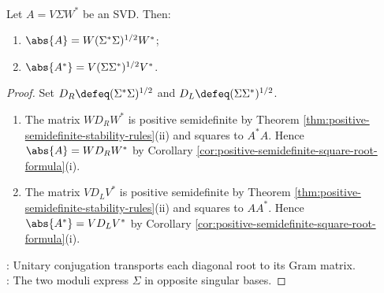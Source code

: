 \begin{proposition} \label{prop:matrix-modulus-from-svd} \\
Let $A=V\Sigma W^*$ be an SVD. Then:
\begin{enumerate}[label=(\roman*)]
\setlength{\itemsep}{0pt}
\item $\abs{A}=W(\Sigma^*\Sigma)^{1/2}W^*$;
\item $\abs{A^*}=V(\Sigma\Sigma^*)^{1/2}V^*$.
\end{enumerate}
\begin{proof}
Set $D_R\defeq(\Sigma^*\Sigma)^{1/2}$ and $D_L\defeq(\Sigma\Sigma^*)^{1/2}$.
\begin{enumerate}[label=(\roman*)]
\setlength{\itemsep}{0pt}
\item The matrix $WD_RW^*$ is positive semidefinite by Theorem \ref{thm:positive-semidefinite-stability-rules}(ii) and squares to $A^*A$. Hence $\abs{A}=WD_RW^*$ by Corollary \ref{cor:positive-semidefinite-square-root-formula}(i).
\item The matrix $VD_LV^*$ is positive semidefinite by Theorem \ref{thm:positive-semidefinite-stability-rules}(ii) and squares to $AA^*$. Hence $\abs{A^*}=VD_LV^*$ by Corollary \ref{cor:positive-semidefinite-square-root-formula}(i).
\end{enumerate}
: Unitary conjugation transports each diagonal root to its Gram matrix.\\
: The two moduli express $\Sigma$ in opposite singular bases.
\end{proof}
\end{proposition}

